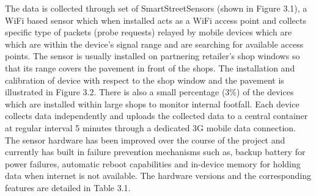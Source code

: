 The data is collected through set of SmartStreetSensors (shown in Figure 3.1), a WiFi based sensor which when installed acts as a WiFi access point and collects specific type of packets (probe requests) relayed by mobile devices which are which are within the device’s signal range and are searching for available access points.
The sensor is usually installed on partnering retailer's shop windows so that its range covers the pavement in front of the shops.
The installation and calibration of device with respect to the shop window and the pavement is illustrated in Figure 3.2.
There is also a small percentage (3\%) of the devices which are installed within large shops to monitor internal footfall.
Each device collects data independently and uploads the collected data to a central container at regular interval 5 minutes through a dedicated 3G mobile data connection.
The sensor hardware has been improved over the course of the project and currently has built in failure prevention mechanisms such as, backup battery for power failures, automatic reboot capabilities and in-device memory for holding data when internet is not available.
The hardware versions and the corresponding features are detailed in Table 3.1.


